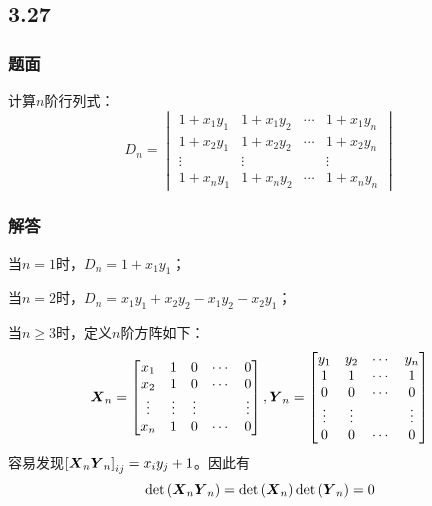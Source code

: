 \documentclass[10pt,xcolor=svgnames]{beamer} %
\begin{document}
\subsection*{3.27}
\begin{frame}
    \frametitle{题面}
    计算\(n\)阶行列式：
    \begin{equation*}
        D_n=
        \begin{vmatrix}
            1+x_{1}y_{1} & 1+x_{1}y_{2} & \cdots & 1+x_{1}y_{n} \\
            1+x_{2}y_{1} & 1+x_{2}y_{2} & \cdots & 1+x_{2}y_{n} \\
            \vdots       & \vdots       &        & \vdots       \\
            1+x_{n}y_{1} & 1+x_{n}y_{2} & \cdots & 1+x_{n}y_{n}
        \end{vmatrix}
    \end{equation*}
\end{frame}
\begin{frame}
    \frametitle{解答}
    当\(n=1\)时，\(D_n=1+x_1y_1\)；

    当\(n=2\)时，\(D_n=x_1y_1+x_2y_2-x_1y_2-x_2y_1\)；
    \pause

    当\(n\geq3\)时，定义\(n\)阶方阵如下：
    \begin{equation*}
        \boldsymbol{X}_n=
        \begin{bmatrix}
            x_{1}  & 1      & 0      & \cdots & 0      \\
            x_{2}  & 1      & 0      & \cdots & 0      \\
            \vdots & \vdots & \vdots &        & \vdots \\
            x_{n}  & 1      & 0      & \cdots & 0
        \end{bmatrix},
        \boldsymbol{Y}_n=
        \begin{bmatrix}
            y_{1}  & y_{2}  & \cdots & y_{n}  \\
            1      & 1      & \cdots & 1      \\
            0      & 0      & \cdots & 0      \\
            \vdots & \vdots &        & \vdots \\
            0      & 0      & \cdots & 0
        \end{bmatrix}
    \end{equation*}
    容易发现\(\left[ \boldsymbol{X}_n\boldsymbol{Y}_n \right]_{ij}=x_iy_j+1\)。因此有
    \begin{equation*}
        \mathrm{det}\left( \boldsymbol{X}_n\boldsymbol{Y}_n \right)=\mathrm{det}\left( \boldsymbol{X}_n \right)\mathrm{det}\left( \boldsymbol{Y}_n \right)=0
    \end{equation*}
\end{frame}
\end{document}
